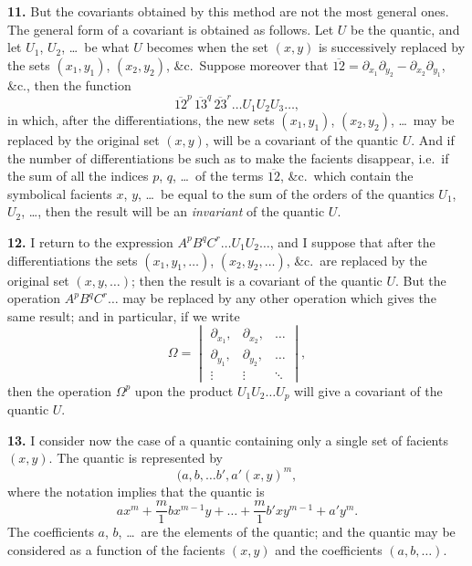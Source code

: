 \documentclass[12pt,a4paper]{article}
\begin{document}
\newpage
\setcounter{page}{227}

\textbf{11.} But the covariants obtained by this method are not the most general ones. The general form of a covariant is obtained as follows. Let $U$ be the quantic, and let $U_1$, $U_2$, \ldots\ be what $U$ becomes when the set $(x, y)$ is successively replaced by the sets $(x_1, y_1)$, $(x_2, y_2)$, \&c.\ Suppose moreover that $\overline{12} = \partial_{x_1}\partial_{y_2} - \partial_{x_2}\partial_{y_1}$, \&c., then the function
\[
\overline{12}^p \, \overline{13}^q \, \overline{23}^r \ldots U_1 U_2 U_3 \ldots,
\]
in which, after the differentiations, the new sets $(x_1, y_1)$, $(x_2, y_2)$, \ldots\ may be replaced by the original set $(x, y)$, will be a covariant of the quantic $U$. And if the number of differentiations be such as to make the facients disappear, i.e.\ if the sum of all the indices $p$, $q$, \ldots\ of the terms $\overline{12}$, \&c.\ which contain the symbolical facients $x$, $y$, \ldots\ be equal to the sum of the orders of the quantics $U_1$, $U_2$, \ldots, then the result will be an \textit{invariant} of the quantic $U$.

\textbf{12.} I return to the expression $A^p B^q C^r \ldots U_1 U_2 \ldots$, and I suppose that after the differentiations the sets $(x_1, y_1, \ldots)$, $(x_2, y_2, \ldots)$, \&c.\ are replaced by the original set $(x, y, \ldots)$; then the result is a covariant of the quantic $U$. But the operation $A^p B^q C^r \ldots$ may be replaced by any other operation which gives the same result; and in particular, if we write
\[
\Omega = \begin{vmatrix}
\partial_{x_1}, & \partial_{x_2}, & \ldots \\
\partial_{y_1}, & \partial_{y_2}, & \ldots \\
\vdots & \vdots & \ddots
\end{vmatrix},
\]
then the operation $\Omega^p$ upon the product $U_1 U_2 \ldots U_p$ will give a covariant of the quantic $U$.

\newpage
\setcounter{page}{228}

\textbf{13.} I consider now the case of a quantic containing only a single set of facients $(x, y)$. The quantic is represented by
\[
(a, b, \ldots b', a' \!\!\!\!(x, y)^m,
\]
where the notation implies that the quantic is
\[
ax^m + \frac{m}{1} bx^{m-1}y + \ldots + \frac{m}{1} b'xy^{m-1} + a'y^m.
\]
The coefficients $a$, $b$, \ldots\ are the elements of the quantic; and the quantic may be considered as a function of the facients $(x, y)$ and the coefficients $(a, b, \ldots)$.
\end{document}
